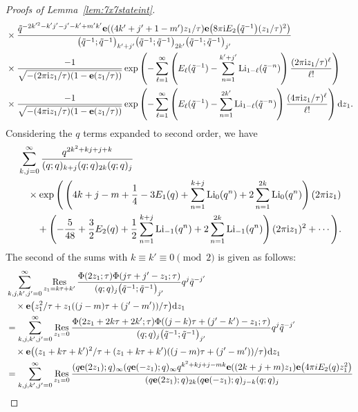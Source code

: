 \documentclass[pdftex]{sigma}
\numberwithin{equation}{section}
\def\tq{\tilde{q}}
\def\Res{\mathrm{Res}}
\def\Li{\mathrm{Li}}
\def\e{\mathbf e}
\def\tq{\tilde{q}}
\def\Res{\mathrm{Res}}
\def\Li{\operatorname{Li}}
\begin{document}
\begin{proof}[Proofs of Lemma~\ref{lem:7x7stateint}]
\begin{align*}
 & \times\frac{\tq^{-2k'^2-k'j'-j'-k'+m'k'}\e((4k'+j'+1-m')z_1/\tau)\e\bigl(8\pi {\rm i} E_2\bigl(\tq^{-1}\bigr)(z_1/\tau)^2\bigr)}{\bigl(\tq^{-1};\tq^{-1}\bigr)_{k'+j'}\bigl(\tq^{-1};\tq^{-1}\bigr)_{2k'}\bigl(\tq^{-1};\tq^{-1}\bigr)_{j'}}\\
 & \times\frac{-1}{\sqrt{-(2\pi {\rm i}z_1/\tau)(1-\e(z_1/\tau))}}\exp\left(-\sum_{\ell=1}^{\infty}\left(E_{\ell}(\tq^{-1})-\sum_{n=1}^{k'+j'}\Li_{1-\ell}(\tq^{-n})\right)\frac{(2\pi {\rm i}z_1/\tau)^{\ell}}{\ell!}\right)\\
 & \times\frac{-1}{\sqrt{-(4\pi {\rm i}z_1/\tau)(1-\e(z_1/\tau))}}\exp\left(-\sum_{\ell=1}^{\infty}\left(E_{\ell}(\tq^{-1})-\sum_{n=1}^{2k'}\Li_{1-\ell}(\tq^{-n})\right)\frac{(4\pi {\rm i}z_1/\tau)^{\ell}}{\ell!}\right){\rm d}z_1 .
\end{align*}
Considering the $q$ terms expanded to second order, we have
\begin{align}
 &\sum_{k,j=0}^{\infty}
 \frac{q^{2k^2+kj+j+k}}{(q;q)_{k+j}(q;q)_{2k}(q;q)_{j}}\nonumber\\
 &\quad{}\times\exp\Bigg(\left(4k+j-m+\frac{1}{4}-3E_{1}(q)+\sum_{n=1}^{k+j}\Li_{0}(q^{n})+2\sum_{n=1}^{2k}\Li_{0}(q^{n})\right)(2\pi {\rm i}z_1)\nonumber\\
 &\qquad{}+\left(- \frac{5}{48}+\frac{3}{2}E_2(q)+\frac{1}{2}\sum_{n=1}^{k+j}\Li_{-1}(q^{n})+2\sum_{n=1}^{2k}\Li_{-1}(q^{n})\right)(2\pi {\rm i}z_1)^2+\cdots\Bigg).\label{eq:exp.tech.ap.1}
\end{align}
The second of the sums with $k\equiv k'\equiv0\pmod{2}$ is given as follows:
\begin{align*}
 &\sum_{k,j,k',j'=0}^{\infty}\mathop{\Res}\limits_{z_1=k\tau+k'}\frac{\Phi(2z_1;\tau)\Phi(j\tau+j'-z_1;\tau)}
 {(q;q)_{j}\bigl(\tq^{-1};\tq^{-1}\bigr)_{j'}}q^{j}\tq^{-j'}\\
 &\quad{}\times \e\bigl(z_1^2/\tau+z_1((j-m)\tau+(j'-m'))/\tau\bigr){\rm d}z_1\\
 & =
 \sum_{k,j,k',j'=0}^{\infty}\mathop{\Res}\limits_{z_1=0} \frac{\Phi(2z_1+2k\tau+2k';\tau)\Phi((j-k)\tau+(j'-k')-z_1;\tau)}{(q;q)_{j}\bigl(\tq^{-1};\tq^{-1}\bigr)_{j'}}q^{j}\tq^{-j'}\\
 &\quad{}\times\e\bigl((z_1+k\tau+k')^2/\tau+(z_1+k\tau+k')((j-m)\tau+(j'-m'))/\tau\bigr){\rm d}z_1\\
 & =
 \sum_{k,j,k',j'=0}^{\infty}\mathop{\Res}\limits_{z_1=0}\frac{(q\e(2z_1);q)_{\infty}(q\e(-z_1);q)_{\infty}q^{k^2+kj+j-mk}\e((2k+j+m)z_{1})\e\bigl(4\pi iE_2(q)z_1^2\bigr)}{(q\e(2z_1);q)_{2k}(q\e(-z_1);q)_{j-k}(q;q)_{j}}\\

\end{align*}
\end{proof}
\end{document}

